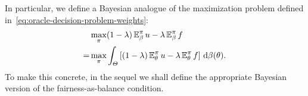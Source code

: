 
%
In particular, we define a Bayesian analogue of the maximization problem defined in~\eqref{eq:oracle-decision-problem-weights}:
%
\begin{align}
  &\max_\pi  (1 - \lambda) \mathop{\mbox{\ensuremath{\mathbb{E}}}}\nolimits^\pi_\beta u - \lambda \mathop{\mbox{\ensuremath{\mathbb{E}}}}\nolimits^\pi_\beta f
  \nonumber \\
  =&
  \max_\pi  \int_\Theta \left[(1 - \lambda) \mathop{\mbox{\ensuremath{\mathbb{E}}}}\nolimits^\pi_\theta u - \lambda \mathop{\mbox{\ensuremath{\mathbb{E}}}}\nolimits^\pi_\theta f\right] \,\mathrm{d}\beta(\theta).
  \label{eq:bayes-decision-problem-weights}
\end{align}
To make this concrete, in the sequel we shall define the appropriate Bayesian version of the fairness-as-balance condition.

